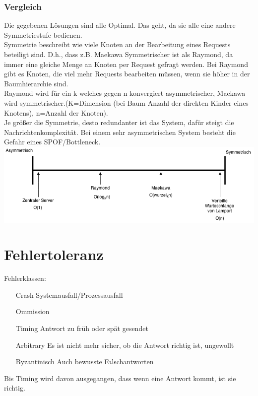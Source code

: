 \documentclass[a4paper]{article}
\begin{document}
\subsubsection{Vergleich}
Die gegebenen Lösungen sind alle Optimal. Das geht, da sie alle eine andere Symmetriestufe bedienen. \\
Symmetrie beschreibt wie viele Knoten an der Bearbeitung eines Requests beteiligt sind. D.h., dass z.B. Maekawa Symmetrischer ist als Raymond, da immer eine gleiche Menge an Knoten per Request gefragt werden. Bei Raymond gibt es Knoten, die viel mehr Requests bearbeiten müssen, wenn sie höher in der Baumhierarchie sind.\\
Raymond wird für ein k welches gegen n konvergiert asymmetrischer, Maekawa wird symmetrischer.(K=Dimension (bei Baum Anzahl der direkten Kinder eines Knotens), n=Anzahl der Knoten).\\
Je größer die Symmetrie, desto redundanter ist das System, dafür steigt die Nachrichtenkomplexität. Bei einem sehr asymmetrischen System besteht die Gefahr eines SPOF/Bottleneck.\\
\includegraphics[scale=0.5]{Asymmetrisch.png}\\
\section{Fehlertoleranz}
Fehlerklassen:
\begin{itemize}
\item[Crash] Systemausfall/Prozessausfall
\item[Ommission] 
\item[Timing] Antwort zu früh oder spät gesendet
\item[Arbitrary] Es ist nicht mehr sicher, ob die Antwort richtig ist, ungewollt
\item[Byzantinisch] Auch bewusste Falschantworten
\end{itemize}
Bis Timing wird davon ausgegangen, dass wenn eine Antwort kommt, ist sie richtig.
\end{document}
